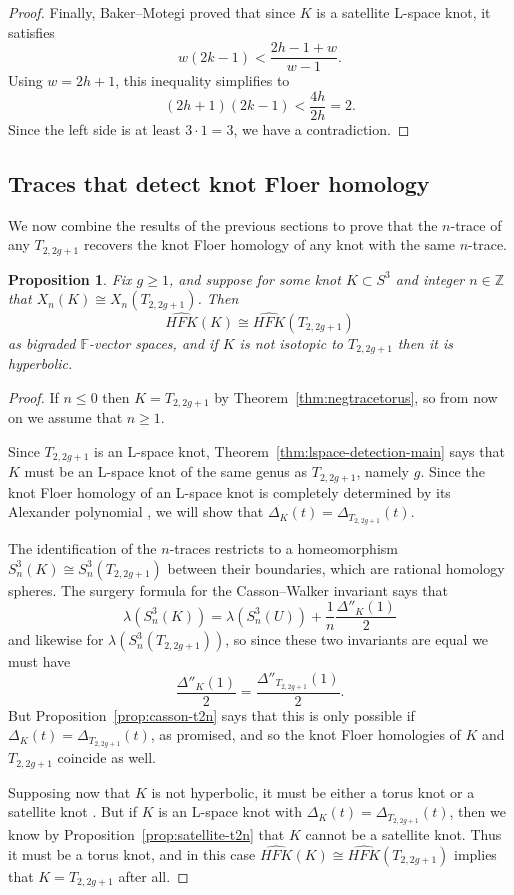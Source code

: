\documentclass[11pt]{amsart}
\newtheorem {proposition}[theorem]{Proposition}
\numberwithin{equation}{section}
\numberwithin{theorem}{section}
\theoremstyle{definition}
\newcommand{\Z}{\mathbb{Z}}
\newcommand{\F}{\mathbb{F}}
\newcommand\hfk{\mathit{HFK}}
\newcommand\hfkhat{\widehat{\hfk}}
\begin{document}
\begin{proof}
Finally, Baker--Motegi \cite[Theorem~7.3]{baker-motegi-twist} proved that since $K$ is a satellite L-space knot, it satisfies
\[ w(2k-1) < \frac{2h-1 + w}{w-1}. \]
Using $w=2h+1$, this inequality simplifies to
\[ (2h+1)(2k-1) < \frac{4h}{2h} = 2. \]
Since the left side is at least $3\cdot 1 = 3$, we have a contradiction.
\end{proof}

%
%
%

\subsection{Traces that detect knot Floer homology}

We now combine the results of the previous sections to prove that the $n$-trace of any $T_{2,2g+1}$ recovers the knot Floer homology of any knot with the same $n$-trace.

\begin{proposition} \label{prop:lspace-trace-hyperbolic}
Fix $g \geq 1$, and suppose for some knot $K \subset S^3$ and integer $n \in \Z$ that $X_n(K) \cong X_n(T_{2,2g+1})$.  Then
\[ \hfkhat(K) \cong \hfkhat(T_{2,2g+1}) \]
as bigraded $\F$-vector spaces, and if $K$ is not isotopic to $T_{2,2g+1}$ then it is hyperbolic.
\end{proposition}

\begin{proof}
If $n\leq 0$ then $K=T_{2,2g+1}$ by Theorem~\ref{thm:negtracetorus}, so from now on we assume that $n \geq 1$.

Since $T_{2,2g+1}$ is an L-space knot, Theorem~\ref{thm:lspace-detection-main} says that $K$ must be an L-space knot of the same genus as $T_{2,2g+1}$, namely $g$.  Since the knot Floer homology of an L-space knot is completely determined by its Alexander polynomial \cite{osz-lens}, we will show that $\Delta_K(t) = \Delta_{T_{2,2g+1}}(t)$.

The identification of the $n$-traces restricts to a homeomorphism $S^3_n(K) \cong S^3_n(T_{2,2g+1})$ between their boundaries, which are rational homology spheres.  The surgery formula for the Casson--Walker invariant \cite{walker} says that
\[ \lambda(S^3_n(K)) = \lambda(S^3_n(U)) + \frac{1}{n}\frac{\Delta''_K(1)}{2} \]
and likewise for $\lambda(S^3_n(T_{2,2g+1}))$, so since these two invariants are equal we must have
\[ \frac{\Delta''_K(1)}{2} = \frac{\Delta''_{T_{2,2g+1}}(1)}{2}. \]
But Proposition~\ref{prop:casson-t2n} says that this is only possible if $\Delta_K(t) = \Delta_{T_{2,2g+1}}(t)$, as promised, and so the knot Floer homologies of $K$ and $T_{2,2g+1}$ coincide as well.

Supposing now that $K$ is not hyperbolic, it must be either a torus knot or a satellite knot \cite[Corollary~2.5]{thurston-kleinian}.  But if $K$ is an L-space knot with $\Delta_K(t) = \Delta_{T_{2,2g+1}}(t)$, then we know by Proposition~\ref{prop:satellite-t2n} that $K$ cannot be a satellite knot.  Thus it must be a torus knot, and in this case $\hfkhat(K) \cong \hfkhat(T_{2,2g+1})$ implies that $K = T_{2,2g+1}$ after all.
\end{proof}
\end{document}
